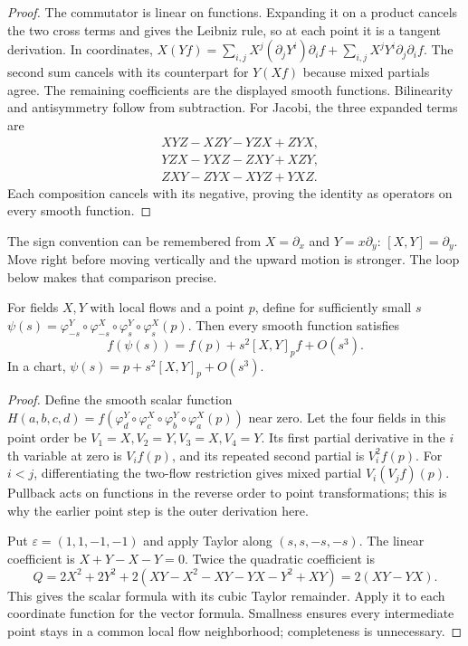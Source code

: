 \begin{proof}
The commutator is linear on functions. Expanding it on a product cancels the two cross terms and gives the Leibniz rule, so at each point it is a tangent derivation. In coordinates,
$X(Yf)=\sum_{i,j}X^j(\partial_jY^i)\partial_if+\sum_{i,j}X^jY^i\partial_j\partial_if$.
The second sum cancels with its counterpart for $Y(Xf)$ because mixed partials agree. The remaining coefficients are the displayed smooth functions. Bilinearity and antisymmetry follow from subtraction. For Jacobi, the three expanded terms are
\[
\begin{aligned}
&XYZ-XZY-YZX+ZYX,\\
&YZX-YXZ-ZXY+XZY,\\
&ZXY-ZYX-XYZ+YXZ.
\end{aligned}
\]
Each composition cancels with its negative, proving the identity as operators on every smooth function.
\end{proof}

The sign convention can be remembered from $X=\partial_x$ and $Y=x\partial_y$: $[X,Y]=\partial_y$. Move right before moving vertically and the upward motion is stronger. The loop below makes that comparison precise.

\begin{theorem}\label{thm:bracketloop}
For fields $X,Y$ with local flows and a point $p$, define for sufficiently small $s$
$\psi(s)=\varphi^Y_{-s}\circ\varphi^X_{-s}\circ\varphi^Y_s\circ\varphi^X_s(p)$. Then every smooth function satisfies
\[
f(\psi(s))=f(p)+s^2[X,Y]_pf+O(s^3).
\]
In a chart, $\psi(s)=p+s^2[X,Y]_p+O(s^3)$.
\end{theorem}

\begin{proof}
Define the smooth scalar function
$H(a,b,c,d)=f(\varphi^Y_d\circ\varphi^X_c\circ\varphi^Y_b\circ\varphi^X_a(p))$ near zero. Let the four fields in this point order be $V_1=X,V_2=Y,V_3=X,V_4=Y$. Its first partial derivative in the $i$th variable at zero is $V_if(p)$, and its repeated second partial is $V_i^2f(p)$. For $i<j$, differentiating the two-flow restriction gives mixed partial $V_i(V_jf)(p)$. Pullback acts on functions in the reverse order to point transformations; this is why the earlier point step is the outer derivation here.

Put $\varepsilon=(1,1,-1,-1)$ and apply Taylor along $(s,s,-s,-s)$. The linear coefficient is $X+Y-X-Y=0$. Twice the quadratic coefficient is
\[
Q=2X^2+2Y^2+2(XY-X^2-XY-YX-Y^2+XY)=2(XY-YX).
\]
This gives the scalar formula with its cubic Taylor remainder. Apply it to each coordinate function for the vector formula. Smallness ensures every intermediate point stays in a common local flow neighborhood; completeness is unnecessary.
\end{proof}

